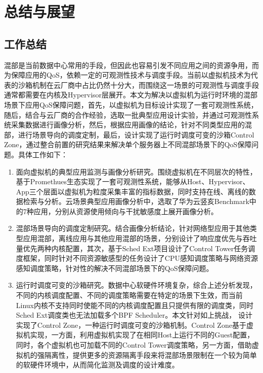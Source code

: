 \chapter{总结与展望}\label{chap:theories_tech}

\section{工作总结}

混部是当前数据中心常用的手段，但因此也容易引发不同应用之间的资源争用，而为保障应用的QoS，依赖一定的可观测性技术与调度手段。当前以虚拟机技术为代表的沙箱机制在云厂商中占比仍然十分大，而围绕这一场景的可观测性与调度手段通常都需要在内核及Hypervisor层展开。本文为解决以虚拟机为运行时环境的混部场景下应用QoS保障问题，首先，以虚拟机为目标设计实现了一套可观测性系统，随后，结合与云厂商的合作经验，选取一批典型应用设计实验，并通过可观测性系统采集数据进行画像分析，然后，根据应用画像的结论，针对不同类型应用的混部，进行场景导向的调度定制，最后，设计实现了运行时调度可变的沙箱Control Zone，通过整合前置的研究结果来解决单个服务器上不同混部场景下的QoS保障问题。具体工作如下：

\begin{enumerate}
    \item 面向虚拟机的典型应用监测与画像分析研究。围绕虚拟机在不同层次的特性，基于Promethues生态实现了一套可观测性系统，能够从Host、Hypervisor、App三个层面以虚拟机为粒度采集丰富的指标数据，同时支持在线、离线的数据检索与分析。云场景典型应用画像分析中，选取了华为云竖亥Benchmark中的7种应用，分别从资源使用倾向与干扰敏感度上展开画像分析。
    \item 混部场景导向的调度定制研究。结合画像分析结论，针对网络型应用于其他类型应用混部，离线应用与其他应用混部的场景，分别设计了响应度优先与吞吐量优先两种内核配置，其次，基于Sched Ext项目设计了Control Tower任务调度框架，同时针对不同资源敏感型的任务设计了CPU感知调度策略与网络资源感知调度策略，针对性的解决不同混部场景下的QoS保障问题。
    \item 运行时调度可变的沙箱研究。数据中心软硬件环境复杂，综合上述分析发现，不同的内核调度配置、不同的调度策略需要在特定的场景下生效，而当前Linux内核不支持同时使能不同的内核调度配置且只提供有限的调度类，同时 Sched Ext调度类也无法加载多个BPF Scheduler。本文针对如上挑战， 设计实现了Control Zone，一种运行时调度可变的沙箱机制。Control Zone基于虚拟机实现，一方面，利用虚拟机实现了在相同Host上运行不同的Guest配置，同时，各个虚拟机也可加载不同的Control Tower调度策略，另一方面，借助虚拟机的强隔离性，提供更多的资源隔离手段来将混部场景限制在一个较为简单的软硬件环境中，从而简化监测及调度的设计难度。
\end{enumerate}

